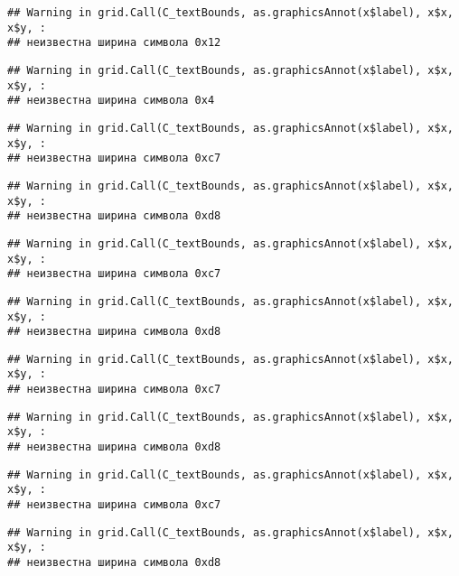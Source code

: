 \documentclass[
]{article}
\begin{document}
\begin{verbatim}
## Warning in grid.Call(C_textBounds, as.graphicsAnnot(x$label), x$x, x$y, :
## неизвестна ширина символа 0x12
\end{verbatim}

\begin{verbatim}
## Warning in grid.Call(C_textBounds, as.graphicsAnnot(x$label), x$x, x$y, :
## неизвестна ширина символа 0x4
\end{verbatim}

\begin{verbatim}
## Warning in grid.Call(C_textBounds, as.graphicsAnnot(x$label), x$x, x$y, :
## неизвестна ширина символа 0xc7
\end{verbatim}

\begin{verbatim}
## Warning in grid.Call(C_textBounds, as.graphicsAnnot(x$label), x$x, x$y, :
## неизвестна ширина символа 0xd8
\end{verbatim}

\begin{verbatim}
## Warning in grid.Call(C_textBounds, as.graphicsAnnot(x$label), x$x, x$y, :
## неизвестна ширина символа 0xc7
\end{verbatim}

\begin{verbatim}
## Warning in grid.Call(C_textBounds, as.graphicsAnnot(x$label), x$x, x$y, :
## неизвестна ширина символа 0xd8
\end{verbatim}

\begin{verbatim}
## Warning in grid.Call(C_textBounds, as.graphicsAnnot(x$label), x$x, x$y, :
## неизвестна ширина символа 0xc7
\end{verbatim}

\begin{verbatim}
## Warning in grid.Call(C_textBounds, as.graphicsAnnot(x$label), x$x, x$y, :
## неизвестна ширина символа 0xd8
\end{verbatim}

\begin{verbatim}
## Warning in grid.Call(C_textBounds, as.graphicsAnnot(x$label), x$x, x$y, :
## неизвестна ширина символа 0xc7
\end{verbatim}

\begin{verbatim}
## Warning in grid.Call(C_textBounds, as.graphicsAnnot(x$label), x$x, x$y, :
## неизвестна ширина символа 0xd8
\end{verbatim}
\end{document}
